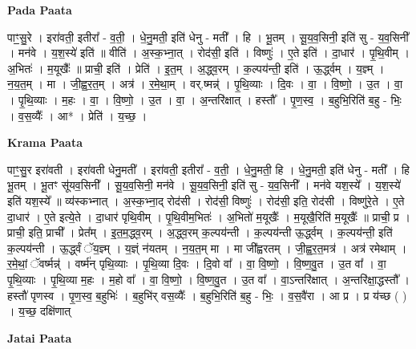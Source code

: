 \documentclass[17pt]{extarticle}
\begin{document}
\textbf{Pada Paata} \newline

पाꣳ॒॒सु॒रे । इरा॑वती॒ इतीरा᳚ - व॒ती॒ । धे॒नु॒मती॒ इति॑ धेनु - मती᳚ । हि । भू॒तम् । सू॒य॒व॒सिनी॒ इति॑ सु - य॒व॒सिनी᳚ । मन॑वे । य॒श॒स्ये॑ इति॑ ॥ वीति॑ । अ॒स्क॒भ्ना॒त् । रोद॑सी॒ इति॑ । विष्णुः॑ । ए॒ते इति॑ । दा॒धार॑ । पृ॒थि॒वीम् । अ॒भितः॑ । म॒यूखैः᳚ ॥ प्राची॒ इति॑ । प्रेति॑ । इ॒त॒म् । अ॒द्ध्व॒रम् । क॒ल्पय॑न्ती॒ इति॑ । ऊ॒र्द्ध्वम् । य॒ज्ञ्म् । न॒य॒त॒म् । मा । जी॒ह्व॒र॒त॒म् । अत्र॑ । र॒मे॒था॒म् । वर्.ष्मन्न्॑ । पृ॒थि॒व्याः । दि॒वः । वा॒ । वि॒ष्णो॒ । उ॒त । वा॒ । पृ॒थि॒व्याः । म॒हः । वा॒ । वि॒ष्णो॒ । उ॒त । वा॒ । अ॒न्तरि॑क्षात् । हस्तौ᳚ । पृ॒ण॒स्व॒ । ब॒हुभि॒रिति॑ ब॒हु - भिः॒ । व॒स॒व्यैः᳚ । आ* । प्रेति॑ । य॒च्छ॒ ।  \newline


\textbf{Krama Paata} \newline

पाꣳ॒॒सु॒र इरा॑वती । इरा॑वती धेनु॒मती᳚ । इरा॑वती॒ इतीरा᳚ - व॒ती॒ । धे॒नु॒मती॒ हि । धे॒नु॒मती॒ इति॑ धेनु - मती᳚ । हि भू॒तम् । भू॒तꣳ सू॑यव॒सिनी᳚ । सू॒य॒व॒सिनी॒ मन॑वे । सू॒य॒व॒सिनी॒ इति॑ सु - य॒व॒सिनी᳚ । मन॑वे यश॒स्ये᳚ । य॒श॒स्ये॑ इति॑ यश॒स्ये᳚ ॥ व्य॑स्कभ्नात् । अ॒स्क॒भ्ना॒द् रोद॑सी । रोद॑सी॒ विष्णुः॑ । रोद॑सी॒ इति॒ रोद॑सी । विष्णु॑रे॒ते । ए॒ते दा॒धार॑ । ए॒ते इत्ये॒ते । दा॒धार॑ पृथि॒वीम् । पृ॒थि॒वीम॒भितः॑ । अ॒भितो॑ म॒यूखैः᳚ । म॒यूखै॒रिति॑ म॒यूखैः᳚ ॥ प्राची॒ प्र । प्राची॒ इति॒ प्राची᳚ । प्रेत᳚म् । इ॒त॒म॒द्ध्व॒रम् । अ॒द्ध्व॒रम् क॒ल्पय॑न्ती । क॒ल्पय॑न्ती ऊ॒र्द्ध्वम् । क॒ल्पय॑न्ती॒ इति॑ क॒ल्पय॑न्ती । ऊ॒र्द्ध्वं ॅय॒ज्ञ्म् । य॒ज्ञ्ं न॑यतम् । न॒य॒त॒म् मा । मा जी᳚ह्वरतम् । जी॒ह्व॒र॒त॒मत्र॑ । अत्र॑ रमेथाम् । र॒मे॒थां॒ ॅवर्ष्मन्न्॑ । वर्ष्म॑न् पृथि॒व्याः । पृ॒थि॒व्या दि॒वः । दि॒वो वा᳚ । वा॒ वि॒ष्णो॒ । वि॒ष्ण॒वु॒त । उ॒त वा᳚ । वा॒ पृ॒थि॒व्याः । पृ॒थि॒व्या म॒हः । म॒हो वा᳚ । वा॒ वि॒ष्णो॒ । वि॒ष्ण॒वु॒त । उ॒त वा᳚ । वा॒ऽन्तरि॑क्षात् । अ॒न्तरि॑क्षा॒द्धस्तौ᳚ । हस्तौ॑ पृणस्व । पृ॒ण॒स्व॒ ब॒हुभिः॑ । ब॒हुभि॑र् वस॒व्यैः᳚ । ब॒हुभि॒रिति॑ ब॒हु - भिः॒ । व॒स॒वै॑रा । आ प्र । प्र य॑च्छ ( ) । य॒च्छ॒ दक्षि॑णात् \newline

\textbf{Jatai Paata} \newline
\end{document}
